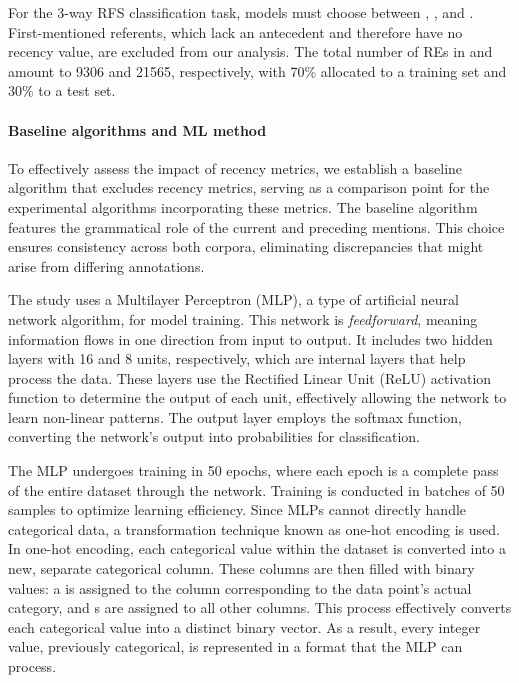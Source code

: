 For the 3-way RFS classification task, models must choose between , , and . First-mentioned referents, which lack an antecedent and therefore have no recency value, are excluded from our analysis. The total number of REs in \msrcor and \wsj amount to 9306 and 21565, respectively, with 70\% allocated to a training set and 30\% to a test set.

\paragraph*{Baseline algorithms and ML method}\label{subsec:baselinesystem}

To effectively assess the impact of recency metrics, we establish a baseline algorithm that excludes recency metrics, serving as a comparison point for the experimental algorithms incorporating these metrics. The baseline algorithm features the grammatical role of the current and preceding mentions. This choice ensures consistency across both corpora, eliminating discrepancies that might arise from differing annotations.

The study uses a Multilayer Perceptron (MLP), a type of artificial neural network algorithm, for model training. This network is \textit{feedforward}, meaning information flows in one direction from input to output. It includes two hidden layers with 16 and 8 units, respectively, which are internal layers that help process the data. These layers use the Rectified Linear Unit (ReLU) activation function to determine the output of each unit, effectively allowing the network to learn non-linear patterns. The output layer employs the softmax function, converting the network's output into probabilities for classification.

The MLP undergoes training in 50 epochs, where each epoch is a complete pass of the entire dataset through the network. Training is conducted in batches of 50 samples to optimize learning efficiency. Since MLPs cannot directly handle categorical data, a transformation technique known as one-hot encoding is used. In one-hot encoding, each categorical value within the dataset is converted into a new, separate categorical column. These columns are then filled with binary values: a  is assigned to the column corresponding to the data point's actual category, and s are assigned to all other columns. This process effectively converts each categorical value into a distinct binary vector. As a result, every integer value, previously categorical, is represented in a format that the MLP can process. 


